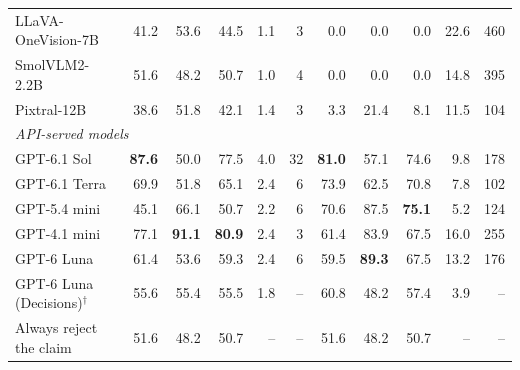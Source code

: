 \begin{table}[t]
\begin{minipage}{.96\textwidth}
\begin{tabular}{@{}lrrrrrrrrrr@{}}
LLaVA-OneVision-7B & 41.2 & 53.6 & 44.5 & 1.1 & 3 & 0.0 & 0.0 & 0.0 & 22.6 & 460\\
SmolVLM2-2.2B & 51.6 & 48.2 & 50.7 & 1.0 & 4 & 0.0 & 0.0 & 0.0 & 14.8 & 395\\
Pixtral-12B & 38.6 & 51.8 & 42.1 & 1.4 & 3 & 3.3 & 21.4 & 8.1 & 11.5 & 104\\
\midrule
\multicolumn{11}{l}{\emph{API-served models}}\\
GPT-6.1 Sol & \textbf{87.6} & 50.0 & 77.5 & 4.0 & 32 & \textbf{81.0} & 57.1 & 74.6 & 9.8 & 178\\
GPT-6.1 Terra & 69.9 & 51.8 & 65.1 & 2.4 & 6 & 73.9 & 62.5 & 70.8 & 7.8 & 102\\
GPT-5.4 mini & 45.1 & 66.1 & 50.7 & 2.2 & 6 & 70.6 & 87.5 & \textbf{75.1} & 5.2 & 124\\
GPT-4.1 mini & 77.1 & \textbf{91.1} & \textbf{80.9} & 2.4 & 3 & 61.4 & 83.9 & 67.5 & 16.0 & 255\\
GPT-6 Luna & 61.4 & 53.6 & 59.3 & 2.4 & 6 & 59.5 & \textbf{89.3} & 67.5 & 13.2 & 176\\
GPT-6 Luna (Decisions)$^{\dagger}$ & 55.6 & 55.4 & 55.5 & 1.8 & -- & 60.8 & 48.2 & 57.4 & 3.9 & --\\
\midrule
Always reject the claim & 51.6 & 48.2 & 50.7 & -- & -- & 51.6 & 48.2 & 50.7 & -- & --\\
\bottomrule
\end{tabular}
\end{minipage}
\end{table}
